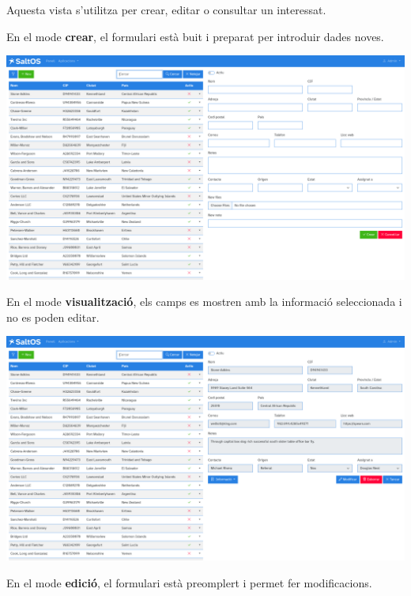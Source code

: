 \documentclass[a4paper]{article}
\begin{document}
Aquesta vista s'utilitza per crear, editar o consultar un interessat.

En el mode \textbf{crear}, el formulari està buit i preparat per introduir dades noves.

\begin{center}\includegraphics[width=1\textwidth]{../ujest/snaps/test-screenshots-js-screenshots-crm-leads-create-ca-es-1-snap.png}\end{center}

En el mode \textbf{visualització}, els camps es mostren amb la informació seleccionada i no es poden editar.

\begin{center}\includegraphics[width=1\textwidth]{../ujest/snaps/test-screenshots-js-screenshots-crm-leads-view-100-ca-es-1-snap.png}\end{center}

En el mode \textbf{edició}, el formulari està preomplert i permet fer modificacions.
\end{document}
